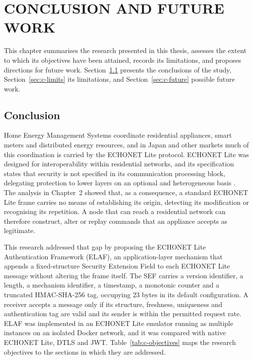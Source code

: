 \providecommand{\tbd}{\textbf{[TBD]}}

\chapter{CONCLUSION AND FUTURE WORK}
\label{ch:conclusion}

This chapter summarises the research presented in this thesis, assesses the extent to which its objectives have been attained, records its limitations, and proposes directions for future work. Section~\ref{sec:c-conclusion} presents the conclusions of the study, Section~\ref{sec:c-limits} its limitations, and Section~\ref{sec:c-future} possible future work.

\section{Conclusion}
\label{sec:c-conclusion}

Home Energy Management Systems coordinate residential appliances, smart meters and distributed energy resources, and in Japan and other markets much of this coordination is carried by the ECHONET Lite protocol. ECHONET Lite was designed for interoperability within residential networks, and its specification states that security is not specified in its communication processing block, delegating protection to lower layers on an optional and heterogeneous basis \citep{ECHONETPart2,ECHONETGuidelines}. The analysis in Chapter~2 showed that, as a consequence, a standard ECHONET Lite frame carries no means of establishing its origin, detecting its modification or recognising its repetition. A node that can reach a residential network can therefore construct, alter or replay commands that an appliance accepts as legitimate.

This research addressed that gap by proposing the ECHONET Lite Authentication Framework (ELAF), an application-layer mechanism that appends a fixed-structure Security Extension Field to each ECHONET Lite message without altering the frame itself. The SEF carries a version identifier, a length, a mechanism identifier, a timestamp, a monotonic counter and a truncated HMAC-SHA-256 tag, occupying 23 bytes in its default configuration. A receiver accepts a message only if its structure, freshness, uniqueness and authentication tag are valid and its sender is within the permitted request rate. ELAF was implemented in an ECHONET Lite emulator running as multiple instances on an isolated Docker network, and it was compared with native ECHONET Lite, DTLS and JWT. Table~\ref{tab:c-objectives} maps the research objectives to the sections in which they are addressed.

